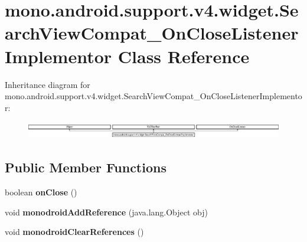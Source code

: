\hypertarget{classmono_1_1android_1_1support_1_1v4_1_1widget_1_1_search_view_compat___on_close_listener_implementor}{}\section{mono.\+android.\+support.\+v4.\+widget.\+Search\+View\+Compat\+\_\+\+On\+Close\+Listener\+Implementor Class Reference}
\label{classmono_1_1android_1_1support_1_1v4_1_1widget_1_1_search_view_compat___on_close_listener_implementor}
Inheritance diagram for mono.\+android.\+support.\+v4.\+widget.\+Search\+View\+Compat\+\_\+\+On\+Close\+Listener\+Implementor\+:\begin{figure}[H]
\begin{center}
\leavevmode
\includegraphics[height=0.771350cm]{classmono_1_1android_1_1support_1_1v4_1_1widget_1_1_search_view_compat___on_close_listener_implementor}
\end{center}
\end{figure}
\subsection*{Public Member Functions}
\begin{DoxyCompactItemize}
\item 
\mbox{\label{classmono_1_1android_1_1support_1_1v4_1_1widget_1_1_search_view_compat___on_close_listener_implementor_af382d1e5ba1dd24c3e6ff0e4e678c4d5}} 
boolean {\bfseries on\+Close} ()
\item 
\mbox{\label{classmono_1_1android_1_1support_1_1v4_1_1widget_1_1_search_view_compat___on_close_listener_implementor_aa57445a3eabf952599982d658b45f796}} 
void {\bfseries monodroid\+Add\+Reference} (java.\+lang.\+Object obj)
\item 
\mbox{\label{classmono_1_1android_1_1support_1_1v4_1_1widget_1_1_search_view_compat___on_close_listener_implementor_a6d5cfc110dcde508f6d83f879700616e}} 
void {\bfseries monodroid\+Clear\+References} ()
\end{DoxyCompactItemize}
